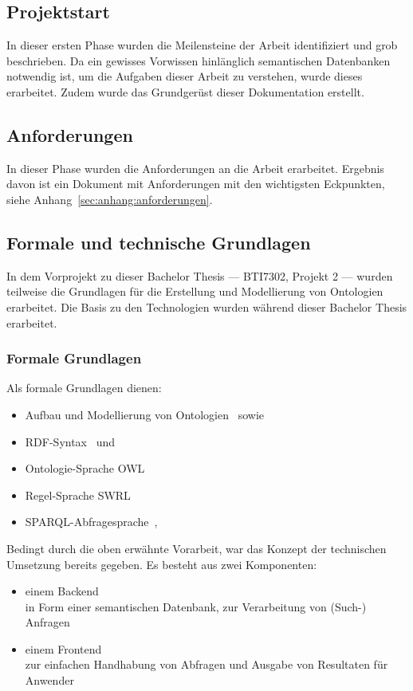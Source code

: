\subsection{Projektstart}
\label{subsec:projektstart}
In dieser ersten Phase wurden die Meilensteine der Arbeit identifiziert und grob beschrieben. Da ein gewisses Vorwissen hinlänglich semantischen Datenbanken notwendig ist, um die Aufgaben dieser Arbeit zu verstehen, wurde dieses erarbeitet. Zudem wurde das Grundgerüst dieser Dokumentation erstellt.

\subsection{Anforderungen}
\label{subsec:anforderungen}
In dieser Phase wurden die Anforderungen an die Arbeit erarbeitet. Ergebnis davon ist ein Dokument mit Anforderungen mit den wichtigsten Eckpunkten, siehe Anhang~\ref{sec:anhang:anforderungen}.

\newpage

\subsection{Formale und technische Grundlagen}
\label{sub:formale_und_technische_grundlagen}
In dem Vorprojekt zu dieser Bachelor Thesis --- BTI7302, Projekt 2 --- wurden teilweise die Grundlagen für die Erstellung und Modellierung von Ontologien erarbeitet. Die Basis zu den Technologien wurden während dieser Bachelor Thesis erarbeitet.

\subsubsection{Formale Grundlagen}
Als formale Grundlagen dienen:
\begin{itemize}
    \item Aufbau und Modellierung von Ontologien~\cite{IspekOntoBedeutung} sowie~\cite{ISpekOntoGeschichte}
    \item RDF-Syntax~\cite{w3rdf} und~\cite{w3rdf_syntax}
    \item Ontologie-Sprache OWL~\cite{w3owl}
    \item Regel-Sprache SWRL~\cite{swrl}
    \item SPARQL-Abfragesprache~\cite{w3sparql_querylang},~\cite{w3sparql_overview}
\end{itemize}

Bedingt durch die oben erwähnte Vorarbeit, war das Konzept der technischen Umsetzung bereits gegeben. Es besteht aus zwei Komponenten:
\begin{itemize}
    \item einem Backend\\
        in Form einer semantischen Datenbank, zur Verarbeitung von (Such-) Anfragen
    \item einem Frontend\\
        zur einfachen Handhabung von Abfragen und Ausgabe von Resultaten für Anwender
\end{itemize}

